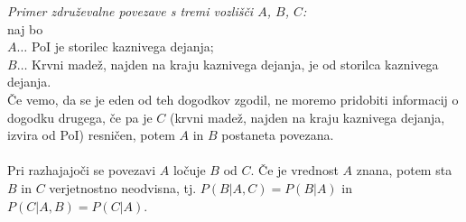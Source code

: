\documentclass[12pt,a4paper]{amsart}
\theoremstyle{definition} %
\theoremstyle{plain} %
\begin{document}
\textit{Primer združevalne povezave s tremi vozlišči $A$, $B$, $C$:\\} naj bo\\
$A \dots$ PoI je storilec kaznivega dejanja;\\
$B \dots$ Krvni madež, najden na kraju kaznivega dejanja, je od storilca kaznivega dejanja.\\
Če vemo, da se je eden od teh dogodkov zgodil, ne moremo pridobiti informacij o dogodku drugega, če pa je $C$ (krvni madež, najden na kraju
kaznivega dejanja, izvira od PoI) resničen, potem $A$ in $B$ postaneta povezana.\\\\
Pri razhajajoči se povezavi $A$ ločuje $B$ od $C$. Če je vrednost $A$ znana, potem sta $B$ in $C$ verjetnostno neodvisna, tj.
$P(B \lvert A, C) = P(B \lvert A)$ in $P(C \lvert A, B) = P(C \lvert A)$.

\end{document}
